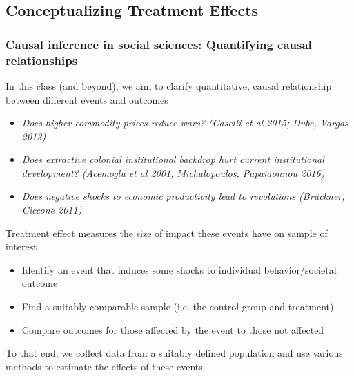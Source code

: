 \documentclass[aspectratio=169]{beamer}
\newenvironment{wideitemize}{\itemize\addtolength{\itemsep}{10pt}}{\enditemize}
\begin{document}
\subsection{Conceptualizing Treatment Effects}
\begin{frame}
\frametitle{Causal inference in social sciences: Quantifying causal relationships} 
\begin{wideitemize}
\item In this class (and beyond), we aim to clarify quantitative, causal relationship between different events and outcomes
\begin{itemize}
\item \textit{Does higher commodity prices reduce wars? (Caselli et al 2015; Dube, Vargas 2013)}
\item \textit{Does extractive colonial institutional backdrop hurt current institutional development? (Acemoglu et al 2001; Michalopoulos, Papaiaonnou 2016)}
\item \textit{Does negative shocks to economic productivity lead to revolutions (Brückner, Ciccone 2011)}
\end{itemize}
\item Treatment effect measures the size of impact these events have on sample of interest
\begin{itemize}
\item Identify an event that induces some shocks to individual behavior/societal outcome
\item Find a suitably comparable sample (i.e. the control group and treatment)
\item Compare outcomes for those affected by the event to those not affected 
\end{itemize}
\item To that end, we collect data from a suitably defined population and use various methods to estimate the effects of these events.
\end{wideitemize}
\end{frame}
\end{document}
